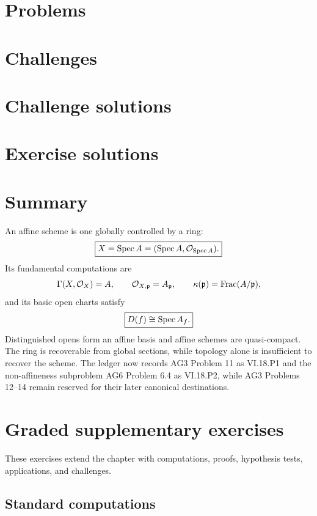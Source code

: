 \section{Problems}


\section{Challenges}


\ifdefined\IncludeChallengeSolutions
\section{Challenge solutions}

\fi

\ifdefined\IncludeExerciseSolutions
\section{Exercise solutions}

\fi

\section*{Summary}

An affine scheme is one globally controlled by a ring:
\[
\boxed{X=\operatorname{Spec} A=(\operatorname{Spec} A,\mathcal O_{\operatorname{Spec} A}).}
\]
Its fundamental computations are
\[
\Gamma(X,\mathcal O_X)=A,
\qquad
\mathcal O_{X,\mathfrak p}=A_{\mathfrak p},
\qquad
\kappa(\mathfrak p)=\operatorname{Frac}(A/\mathfrak p),
\]
and its basic open charts satisfy
\[
\boxed{D(f)\cong\operatorname{Spec} A_f.}
\]
Distinguished opens form an affine basis and affine schemes are quasi-compact.  The ring is
recoverable from global sections, while topology alone is insufficient to recover the
scheme.  The ledger now records AG3 Problem 11 as VI.18.P1 and the non-affineness
subproblem AG6 Problem 6.4 as VI.18.P2, while AG3 Problems 12--14 remain reserved for their
later canonical destinations.
\section{Graded supplementary exercises}
These exercises extend the chapter with computations, proofs, hypothesis tests, applications, and challenges.

\subsection*{Standard computations}

